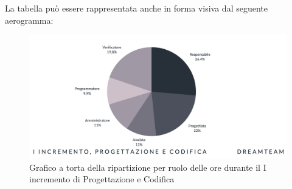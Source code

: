 La tabella può essere rappresentata anche in forma visiva dal seguente aerogramma:
\begin{figure}[H]
\centering
\includegraphics[scale=0.55]{Sezioni/SezioniPreventivo/grafici/Preventivo_torta_progettazione_I.png}
\caption{Grafico a torta della ripartizione per ruolo delle ore durante il I incremento di Progettazione e Codifica}
\end{figure}

\pagebreak

